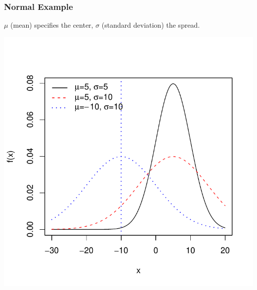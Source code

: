 \documentclass[slides]{beamer}
\begin{document}
\begin{frame}
\frametitle{Normal Example}
$\mu$ (mean) specifies the center, $\sigma$ (standard deviation) the spread.
\begin{center}
\includegraphics{figure/lec02-005}
\end{center}
\end{frame}
\end{document}
